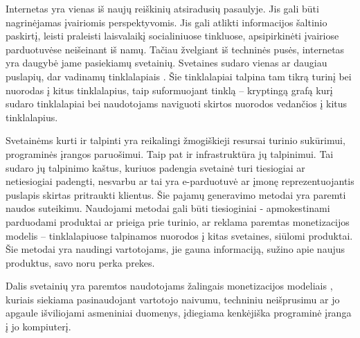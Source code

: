 
Internetas yra vienas iš naujų reiškinių atsiradusių pasaulyje. Jis gali būti nagrinėjamas įvairiomis perspektyvomis. Jis gali atlikti informacijos šaltinio paskirtį, leisti praleisti laisvalaikį socialiniuose tinkluose, apsipirkinėti įvairiose parduotuvėse neišeinant iš namų.  Tačiau žvelgiant iš techninės pusės, internetas yra daugybė jame pasiekiamų svetainių. Svetaines sudaro vienas ar daugiau puslapių, dar vadinamų tinklalapiais . Šie tinklalapiai talpina tam tikrą turinį bei nuorodas į kitus tinklalapius, taip suformuojant tinklą -- kryptingą grafą kurį sudaro tinklalapiai bei naudotojams naviguoti skirtos nuorodos vedančios į kitus tinklalapius.

Svetainėms kurti ir talpinti yra reikalingi žmogiškieji resursai turinio sukūrimui, programinės įrangos paruošimui. Taip pat ir infrastruktūra jų talpinimui. Tai sudaro jų talpinimo kaštus, kuriuos padengia svetainė turi tiesiogiai ar netiesiogiai padengti, nesvarbu ar tai yra e-parduotuvė ar įmonę reprezentuojantis puslapis skirtas pritraukti klientus. Šie pajamų generavimo metodai yra paremti naudos suteikimu. Naudojami metodai gali būti tiesioginiai - apmokestinami parduodami produktai ar prieiga prie turinio, ar reklama paremtas monetizacijos modelis -- tinklalapiuose talpinamos nuorodos į kitas svetaines, siūlomi produktai. Šie metodai yra naudingi vartotojams, jie gauna informaciją, sužino apie naujus produktus, savo noru perka prekes.

Dalis svetainių yra paremtos naudotojams žalingais monetizacijos modeliais \cite{tax}, kuriais siekiama pasinaudojant vartotojo naivumu, techniniu neišprusimu ar jo apgaule išviliojami asmeniniai duomenys, įdiegiama kenkėjiška programinė įranga į jo kompiuterį.